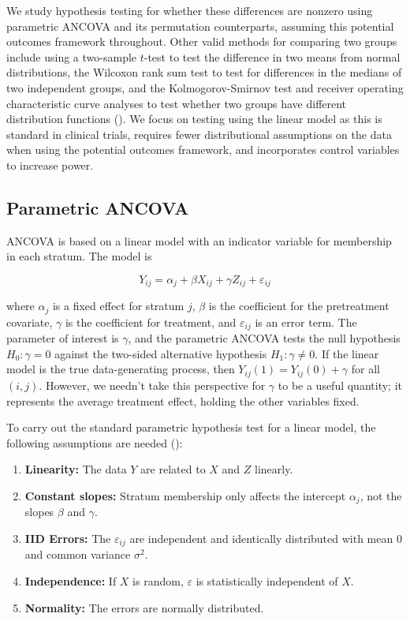 \documentclass[12pt]{article}
\begin{document}
We study hypothesis testing for whether these differences are nonzero using parametric ANCOVA and its permutation counterparts, assuming this potential outcomes framework throughout.
Other valid methods for comparing two groups include using a two-sample $t$-test to test the difference in two means from normal distributions,
the Wilcoxon rank sum test to test for differences in the medians of two independent groups, 
and the Kolmogorov-Smirnov test and receiver operating characteristic curve analyses to test whether two groups have different distribution functions (\cite{lehmann_nonparametrics_1975,  vexler_statistical_2016}).
We focus on testing using the linear model as this is standard in clinical trials, requires fewer distributional assumptions on the data when using the potential outcomes framework, and incorporates control variables to increase power.


\subsection{Parametric ANCOVA}\label{subsec:ancova}

ANCOVA is based on a linear model with an indicator variable for membership in each stratum.
The model is

\begin{equation}\label{eqn:ancova}
Y_{ij} = \alpha_j + \beta X_{ij} + \gamma Z_{ij} + \varepsilon_{ij}
\end{equation}

\noindent where $\alpha_j$ is a fixed effect for stratum $j$, $\beta$ is the coefficient for the pretreatment covariate,
$\gamma$ is the coefficient for treatment,
and $\varepsilon_{ij}$ is an error term.
The parameter of interest is $\gamma$, and the parametric ANCOVA tests the null hypothesis $H_0: \gamma = 0$ against
the two-sided alternative hypothesis $H_1: \gamma \neq 0$.
If the linear model is the true data-generating process, then $Y_{ij}(1) = Y_{ij}(0) + \gamma$ for all $(i, j)$.
However, we needn't take this perspective for $\gamma$ to be a useful quantity; it represents the average treatment effect, holding the other variables fixed.



To carry out the standard parametric hypothesis test for a linear model, the following assumptions are needed (\cite{freedman_statistical_2005}):
\begin{enumerate}
\item \textbf{Linearity:} The data $Y$ are related to $X$ and $Z$ linearly.
\item \textbf{Constant slopes:} Stratum membership only affects the intercept $\alpha_j$, not the slopes $\beta$ and $\gamma$.
\item \textbf{IID Errors:} The $\varepsilon_{ij}$ are independent and identically distributed with mean $0$ and common variance $\sigma^2$.
\item \textbf{Independence:} If $X$ is random, $\varepsilon$ is statistically independent of $X$.
\item \textbf{Normality:} The errors are normally distributed.
\end{enumerate}
\end{document}
